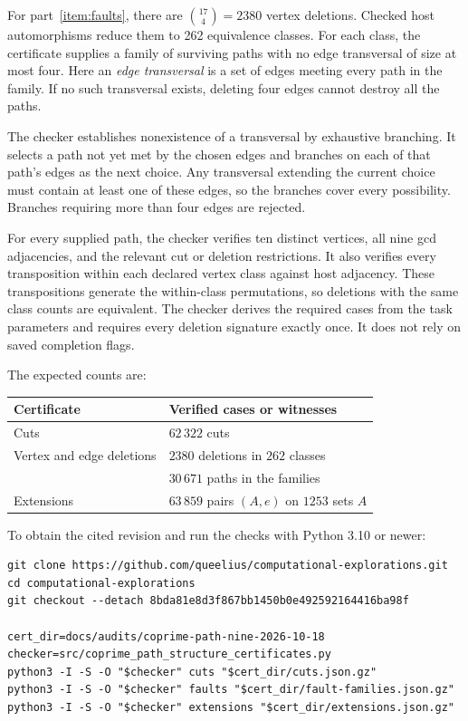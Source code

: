 \documentclass[12pt]{article}
\begin{document}
For part~\ref{item:faults}, there are
$\binom{17}{4}=2380$ vertex deletions.
Checked host automorphisms reduce them to 262 equivalence
classes. For each class, the certificate supplies a family
of surviving paths with no edge transversal of size at most
four. Here an \emph{edge transversal} is a set of edges
meeting every path in the family. If no such transversal
exists, deleting four edges cannot destroy all the paths.

The checker establishes nonexistence of a transversal by
exhaustive branching. It selects a path not yet met by the
chosen edges and branches on each of that path's edges as
the next choice. Any transversal extending the current
choice must contain at least one of these edges, so the
branches cover every possibility. Branches requiring more
than four edges are rejected.

For every supplied path, the checker verifies ten distinct
vertices, all nine gcd adjacencies, and the relevant cut
or deletion restrictions. It also verifies every transposition
within each declared vertex class against host adjacency.
These transpositions generate the within-class permutations,
so deletions with the same class counts are equivalent.
The checker derives the required cases from the task
parameters and requires every deletion signature exactly
once. It does not rely on saved completion flags.

The expected counts are:
\begin{center}
\begin{tabular}{ll}
\hline
Certificate & Verified cases or witnesses\\
\hline
Cuts & $62\,322$ cuts\\
Vertex and edge deletions & $2380$ deletions in $262$ classes\\
                         & $30\,671$ paths in the families\\
Extensions & $63\,859$ pairs $(A,e)$ on $1253$ sets $A$\\
\hline
\end{tabular}
\end{center}

To obtain the cited revision and run the checks with Python
3.10 or newer:

\noindent\begin{minipage}{\linewidth}
\small
\begin{verbatim}
git clone https://github.com/queelius/computational-explorations.git
cd computational-explorations
git checkout --detach 8bda81e8d3f867bb1450b0e492592164416ba98f

cert_dir=docs/audits/coprime-path-nine-2026-10-18
checker=src/coprime_path_structure_certificates.py
python3 -I -S -O "$checker" cuts "$cert_dir/cuts.json.gz"
python3 -I -S -O "$checker" faults "$cert_dir/fault-families.json.gz"
python3 -I -S -O "$checker" extensions "$cert_dir/extensions.json.gz"
\end{verbatim}
\end{minipage}
\end{document}
